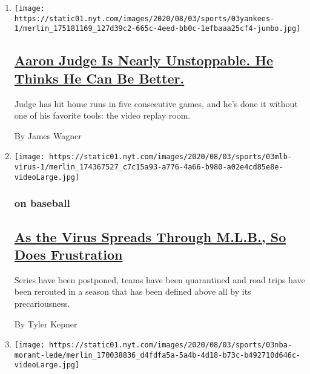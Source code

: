 \begin{enumerate}
\def\labelenumi{\arabic{enumi}.}
\item
  \texttt{[image: https://static01.nyt.com/images/2020/08/03/sports/03yankees-1/merlin\_175181169\_127d39c2-665c-4eed-bb0c-1efbaaa25cf4-jumbo.jpg]}

  \hypertarget{aaron-judge-is-nearly-unstoppable-he-thinks-he-can-be-better}{%
  \subsection{\texorpdfstring{\href{/2020/08/03/sports/baseball/aaron-judge-yankees.html}{Aaron
  Judge Is Nearly Unstoppable. He Thinks He Can Be
  Better.}}{Aaron Judge Is Nearly Unstoppable. He Thinks He Can Be Better.}}\label{aaron-judge-is-nearly-unstoppable-he-thinks-he-can-be-better}}

  Judge has hit home runs in five consecutive games, and he's done it
  without one of his favorite tools: the video replay room.

  By James Wagner
\item
  \texttt{[image: https://static01.nyt.com/images/2020/08/03/sports/03mlb-virus-1/merlin\_174367527\_c7c15a93-a776-4a66-b980-a02e4cd85e8e-videoLarge.jpg]}

  \hypertarget{on-baseball}{%
  \subsubsection{on baseball}\label{on-baseball}}

  \hypertarget{as-the-virus-spreads-through-mlb-so-does-frustration}{%
  \subsection{\texorpdfstring{\href{/2020/08/03/sports/baseball/mlb-coronavirus-outbreak.html}{As
  the Virus Spreads Through M.L.B., So Does
  Frustration}}{As the Virus Spreads Through M.L.B., So Does Frustration}}\label{as-the-virus-spreads-through-mlb-so-does-frustration}}

  Series have been postponed, teams have been quarantined and road trips
  have been rerouted in a season that has been defined above all by its
  precariousness.

  By Tyler Kepner
\item
  \texttt{[image: https://static01.nyt.com/images/2020/08/03/sports/03nba-morant-lede/merlin\_170038836\_d4fdfa5a-5a4b-4d18-b73c-b492710d646c-videoLarge.jpg]}


\end{enumerate}
